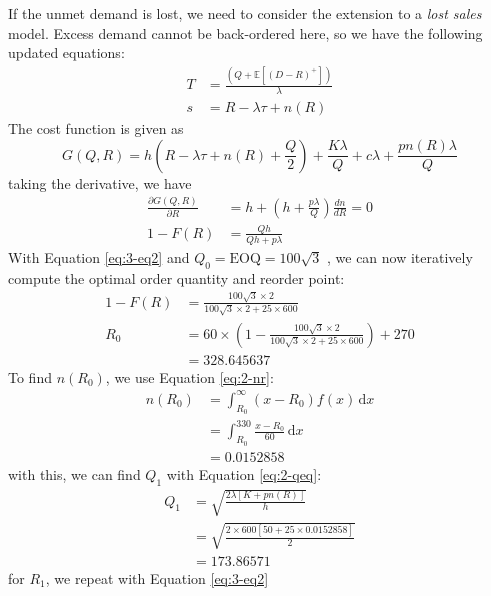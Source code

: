 \documentclass[12pt]{article}
\begin{document}

If the unmet demand is lost, we need to consider the extension to a \textit{lost sales} model. Excess demand cannot be back-ordered here, so we have the following updated equations: \begin{align}
    T &= \frac{ \left(Q + \mathbb{E}[(D-R)^{+}] \right)}{\lambda} \\ 
    s &= R - \lambda \tau + n(R)
\end{align} The cost function is given as \begin{equation}
    G(Q,R) = h\left(R-\lambda \tau + n(R) + \frac{Q}{2}\right) + \frac{K\lambda}{Q} + c \lambda + \frac{pn(R)\lambda}{Q}
\end{equation} taking the derivative, we have \begin{align}\nonumber
    \frac{\partial G(Q,R)}{\partial R} &= h + \left( h + \frac{p\lambda}{Q} \right) \frac{dn}{dR} = 0 \\ \label{eq:3-eq2}
    1-F(R) &= \frac{Qh}{Qh+p\lambda}
\end{align} With Equation \ref{eq:3-eq2} and $Q_{0} = \text{EOQ} = 100\sqrt{3}$ , we can now iteratively compute the optimal order quantity and reorder point: \begin{align*}
    1-F(R) &= \frac{100\sqrt{3} \times 2}{100\sqrt{3} \times 2 + 25 \times 600} \\ 
    R_{0} &= 60\times \left( 1 - \frac{100\sqrt{3} \times 2}{100\sqrt{3} \times 2 + 25 \times 600} \right) + 270 \\ 
    &= 328.645637
\end{align*} To find $n(R_{0})$, we use Equation \ref{eq:2-nr}: \begin{align*}
    n(R_{0}) &= \int_{R_{0}}^{\infty} (x-R_{0})f(x) \, \mathrm{d}x \\ 
    &= \int_{R_{0}}^{330} \frac{x-R_{0}}{60} \, \mathrm{d}x \\ 
    &= 0.0152858
\end{align*} with this, we can find $Q_{1}$ with Equation \ref{eq:2-qeq}: \begin{align*}
    Q_{1} &= \sqrt{ \frac{2\lambda[K + pn(R)]}{h}} \\ 
    &= \sqrt{ \frac{2 \times 600 [50 + 25 \times 0.0152858]}{2}} \\ 
    &= 173.86571
\end{align*} for $R_{1}$, we repeat with Equation \ref{eq:3-eq2} \begin{align*}

\end{align*}
\end{document}
